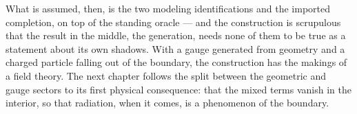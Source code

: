 What is assumed, then, is the two modeling identifications and the imported completion, on top of the
standing oracle --- and the construction is scrupulous that the result in the middle, the generation,
needs none of them to be true as a statement about its own shadows. With a gauge generated from geometry
and a charged particle falling out of the boundary, the construction has the makings of a field theory.
The next chapter follows the split between the geometric and gauge sectors to its first physical
consequence: that the mixed terms vanish in the interior, so that radiation, when it comes, is a
phenomenon of the boundary.
